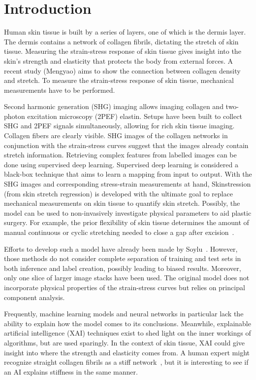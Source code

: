 \section{Introduction}

Human skin tissue is built by a series of layers, one of which is the dermis layer.
The dermis contains a network of collagen fibrils, dictating the stretch of skin tissue.
Measuring the strain-stress response of skin tissue gives insight into the skin's strength and elasticity that protects the body from external forces.
A recent study (Mengyao) aims to show the connection between collagen density and stretch.
To measure the strain-stress response of skin tissue, mechanical measurements have to be performed.

Second harmonic generation (SHG) imaging allows imaging collagen and two-photon excitation microscopy (2PEF) elastin.
Setups have been built to collect SHG and 2PEF signals simultaneously, allowing for rich skin tissue imaging.
Collagen fibers are clearly visible.
SHG images of the collagen networks in conjunction with the strain-stress curves suggest that the images already contain stretch information.
Retrieving complex features from labelled images can be done using supervised deep learning.
Supervised deep learning is considered a black-box technique that aims to learn a mapping from input to output.
With the SHG images and corresponding stress-strain measurements at hand, Skinstression (from skin stretch regression) is developed with the ultimate goal to replace mechanical measurements on skin tissue to quantify skin stretch.
Possibly, the model can be used to non-invasively investigate physical parameters to aid plastic surgery.
For example, the prior flexibility of skin tissue determines the amount of manual continuous or cyclic stretching needed to close a gap after excision~\cite{Verhaegen2012}.

Efforts to develop such a model have already been made by Soylu~\cite{Soylu2022}.
However, those methods do not consider complete separation of training and test sets in both inference and label creation, possibly leading to biased results.
Moreover, only one slice of larger image stacks have been used.
The original model does not incorporate physical properties of the strain-stress curves but relies on principal component analysis.

Frequently, machine learning models and neural networks in particular lack the ability to explain how the model comes to its conclusions.
Meanwhile, explainable artificial intelligence (XAI) techniques exist to shed light on the inner workings of algorithms, but are used sparingly.
In the context of skin tissue, XAI could give insight into where the strength and elasticity comes from.
A human expert might recognize straight collagen fibrils as a stiff network~\cite{Holzapfel2001}, but it is interesting to see if an AI explains stiffness in the same manner.

